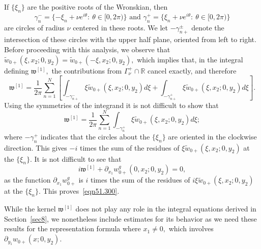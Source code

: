 \documentclass[11pt]{article}
\newcommand\fw{\mathfrak w}
\newcommand\tw{\tilde w_{0+}}
\newcommand\bbR{\mathbb R}
\newcommand\pa{\partial}
\theoremstyle{definition}
\theoremstyle{remark}
\begin{document}
If $\{\xi_n\}$ are the positive roots of the Wronskian, then
\begin{equation}
  \gamma^{-}_n=\{-\xi_n+\nu e^{i\theta}:\:\theta\in [0,2\pi)\}\text{ and }
     \gamma^{+}_n=\{\xi_n+\nu e^{i\theta}:\:\theta\in [0,2\pi)\}
\end{equation}
are circles of radius $\nu$ centered in these roots.  We let $-\gamma^{\pm}_{n+}$
denote the intersection of these circles with the upper half plane, oriented from left to
right. Before proceeding with this analysis, we observe that
$\tw(\xi,x_2;0,y_2)=\tw(-\xi,x_2;0,y_2),$ which implies that, in the integral defining
$\fw^{[1]},$ the contributions from $\Gamma_{\nu}^+\cap\bbR$ cancel exactly, and
therefore
\begin{equation}
  \fw^{[1]}=\frac{1}{2\pi}\sum_{n=1}^N\left[\int_{-\gamma^{-}_{n+}}\xi\tw(\xi,x_2;0,y_2)d\xi+
    \int_{-\gamma^{+}_{n+}}\xi\tw(\xi,x_2;0,y_2)d\xi\right].
\end{equation}
Using the symmetries of the integrand it is not difficult to show that
\begin{equation}
  \fw^{[1]}=\frac{1}{2\pi}\sum_{n=1}^N\int_{-\gamma^{+}_n}\xi\tw(\xi,x_2;0,y_2)d\xi;  
\end{equation}
where $-\gamma^+_n$ indicates that the circles about the $\{\xi_n\}$ are oriented in
the clockwise direction. This gives $-i$ times the sum of the residues of
$\xi\tw(\xi,x_2;0,y_2)$ at  the $\{\xi_n\}.$ It is not difficult to see that
\begin{equation}
  i\fw^{[1]}+\pa_{x_1}w_{0+}^g(0,x_2;0,y_2)=0,
\end{equation}
as the function $\pa_{x_1}w_{0+}^g$ is $i$ times the sum of the residues of
$i\xi\tw(\xi,x_2;0,y_2)$ at  the $\{\xi_n\}.$  This proves~\eqref{eqn51.300}.

While the kernel $\fw^{[1]}$ does not play any role in the integral equations
derived in Section~\ref{sec8}, we nonetheless include estimates for its behavior
as we need these results for the representation formula where $x_1\neq 0,$ which
involves $\pa_{y_1}w_{0+}(x;0,y_2).$
\end{document}
